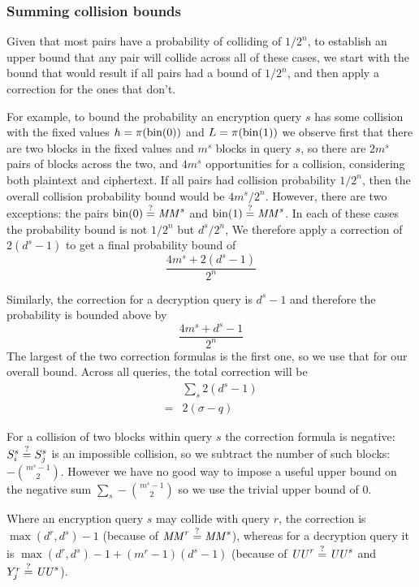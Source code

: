 \documentclass[hctr.tex]{subfiles}
\begin{document}
\subsubsection{Summing collision bounds}
Given that most pairs have a probability of
colliding of \(1/2^n\), 
to establish an upper bound that any pair
will collide across all of these cases,
we start with the bound that would result
if all pairs had a bound of \(1/2^n\),
and then apply a correction for the ones that don't.

For example,
to bound the probability an encryption query \(s\)
has some collision with the fixed values
\(h = \pi(\operatorname{bin}(0))\) and \(L = \pi(\operatorname{bin}(1))\)
we observe first that
there are two blocks in the fixed values
and \(m^s\) blocks in query \(s\), so there are
\(2m^s\) pairs of blocks across the two,
and \(4m^s\) opportunities for a collision, 
considering both plaintext and ciphertext.
If all pairs had collision probability \(1/2^n\),
then the overall collision probability bound
would be \(4m^s/2^n\). However, there are
two exceptions: the pairs
\(\operatorname{bin}(0) \stackrel{\text{?}}{=} \mathit{MM}^s\) and
\(\operatorname{bin}(1) \stackrel{\text{?}}{=} \mathit{MM}^s\). In each of these
cases the probability bound is not \(1/2^n\) but
\(d^s/2^n\), We therefore apply a correction
of \(2(d^s - 1)\) to get a final probability bound of
\begin{displaymath}
    \frac{4m^s + 2(d^s - 1)}{2^n}
\end{displaymath}

Similarly, the correction for a decryption query is
\(d^s - 1\) and therefore  the probability 
is bounded above by
\begin{displaymath}
    \frac{4m^s + d^s -1}{2^n}
\end{displaymath}
The largest of the two correction formulas is
the first one, so we use that for our overall bound.
Across all queries, the total
correction will be
\begin{align*}
    &\sum_s 2(d^s - 1) \\
    = & 2(\sigma - q)
\end{align*}

For a collision of two blocks within query \(s\)
the correction formula is negative:
\(S_i^s \stackrel{\text{?}}{=} S_j^s\) is an impossible collision, 
so we subtract the number of such blocks:
\(-\binom{m^s -1}{2}\). However we have no good way
to impose a useful upper bound on the negative sum
\(\sum_s-\binom{m^s -1}{2}\) so we use the
trivial upper bound of 0.

Where an encryption query \(s\)
may collide with query \(r\), the correction is 
\(\max(d^r, d^s) -1\)
(because of \(\mathit{MM}^r \stackrel{\text{?}}{=} \mathit{MM}^s\)), whereas for a decryption query
it is \(\max(d^r, d^s) -1 + (m^r -1 )(d^s -1)\)
(because of \(\mathit{UU}^r \stackrel{\text{?}}{=} \mathit{UU}^s\) and \(Y_j^r \stackrel{\text{?}}{=} \mathit{UU}^s\)).
\end{document}
